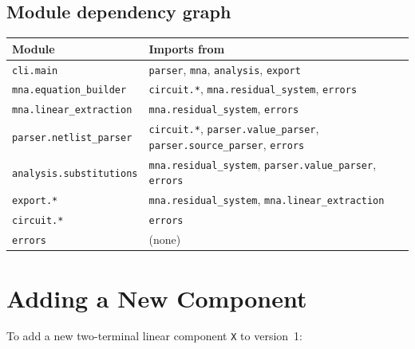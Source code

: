 \documentclass[11pt,a4paper]{article}
\newcommand{\code}[1]{\texttt{#1}}
\begin{document}
\subsection{Module dependency graph}

\begin{center}
\begin{tabular}{lp{}}
\toprule
Module & Imports from \\
\midrule
\code{cli.main}            & \code{parser}, \code{mna}, \code{analysis}, \code{export} \\
\code{mna.equation\_builder}  & \code{circuit.*}, \code{mna.residual\_system}, \code{errors} \\
\code{mna.linear\_extraction} & \code{mna.residual\_system}, \code{errors} \\
\code{parser.netlist\_parser} & \code{circuit.*}, \code{parser.value\_parser},
                               \code{parser.source\_parser}, \code{errors} \\
\code{analysis.substitutions} & \code{mna.residual\_system}, \code{parser.value\_parser},
                               \code{errors} \\
\code{export.*}            & \code{mna.residual\_system}, \code{mna.linear\_extraction} \\
\code{circuit.*}           & \code{errors} \\
\code{errors}              & (none) \\
\bottomrule
\end{tabular}
\end{center}

\section{Adding a New Component}
\label{sec:extending}

To add a new two-terminal linear component \code{X} to version~1:
\end{document}
